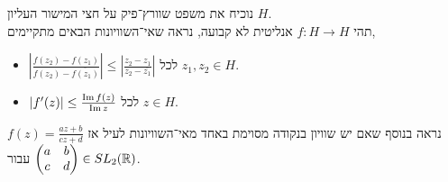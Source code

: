 \question{}
נוכיח את משפט שוורץ־פיק על חצי המישור העליון $H$. \\
תהי $f : H \to H$ אנליטית לא קבועה, נראה שאי־השוויונות הבאים מתקיימים,
\begin{itemize}
	\item $\left\lvert \frac{f(z_2) - f(z_1)}{f(z_2) - \overline{f(z_1)}} \right\rvert \le \left\lvert \frac{z_2 - z_1}{z_2 - \overline{z_1}} \right\rvert$ לכל $z_1, z_2 \in H$.
	\item $|f'(z)| \le \frac{\operatorname{Im} f(z)}{\operatorname{Im} z}$ לכל $z \in H$.
\end{itemize}
נראה בנוסף שאם יש שוויון בנקודה מסוימת באחד מאי־השוויונות לעיל אז $f(z) = \frac{az + b}{cz + d}$ עבור $\begin{pmatrix} a & b \\ c & d \end{pmatrix} \in SL_2(\mathbb{R})$.
